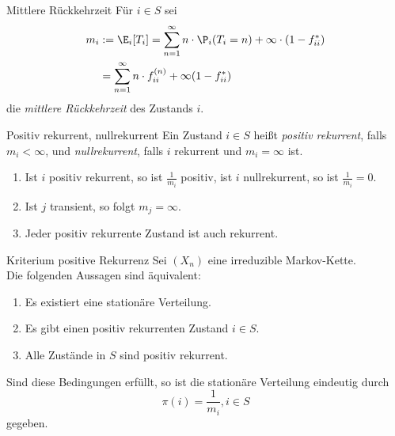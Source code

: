 \begin{karte}{Mittlere Rückkehrzeit}
    Für \(i\in S\) sei 
    \begin{align*}
        m_i &:= \E_i[T_i] = \sum_{n=1}^\infty n \cdot \P_i(T_i = n) + \infty \cdot (1-f_{ii}^*) \\
        &= \sum_{n=1}^\infty n \cdot f_{ii}^{(n)} + \infty (1-f_{ii}^*)
    \end{align*}
    die \textit{mittlere Rückkehrzeit} des Zustands \(i\).
\end{karte}

\begin{karte}{Positiv rekurrent, nullrekurrent}
    Ein Zustand \(i\in S\) heißt \textit{positiv rekurrent}, 
    falls \(m_i < \infty\), und \textit{nullrekurrent}, falls 
    \(i\) rekurrent und \(m_i = \infty\) ist.

    \begin{enumerate}
        \item Ist \(i\) positiv rekurrent, so ist \(\frac{1}{m_i}\) positiv, 
        ist \(i\) nullrekurrent, so ist \(\frac{1}{m_i} = 0\).
        \item Ist \(j\) transient, so folgt \(m_j = \infty\).
        \item Jeder positiv rekurrente Zustand ist auch rekurrent.
    \end{enumerate}
\end{karte}

\begin{karte}{Kriterium positive Rekurrenz}
    Sei \((X_n)\) eine irreduzible Markov-Kette. \\
    Die folgenden Aussagen sind äquivalent:
    \begin{enumerate}
        \item Es existiert eine stationäre Verteilung.
        \item Es gibt einen positiv rekurrenten Zustand \(i\in S\).
        \item Alle Zustände in \(S\) sind positiv rekurrent.
    \end{enumerate}

    Sind diese Bedingungen erfüllt, so ist die stationäre Verteilung eindeutig durch 
    \[ \pi(i) = \frac{1}{m_i}, i\in S \] 
    gegeben.
\end{karte}

